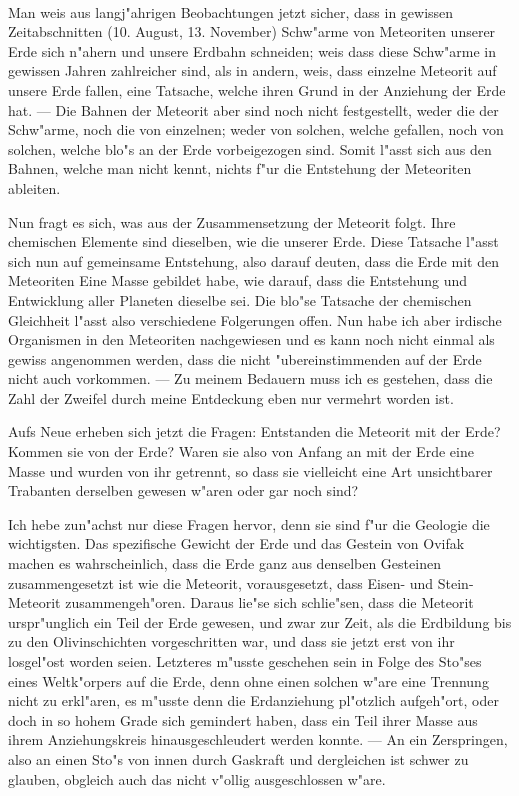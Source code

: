 \documentclass[a4paper, 11pt, oneside]{article}
\begin{document}
\paragraph{}
Man weis aus langj"ahrigen Beobachtungen jetzt sicher, dass in gewissen Zeitabschnitten (10. August, 13. November) Schw"arme von Meteoriten unserer Erde sich n"ahern und unsere Erdbahn schneiden; weis dass diese Schw"arme in gewissen Jahren zahlreicher sind, als in andern, weis, dass einzelne Meteorit auf unsere Erde fallen, eine Tatsache, welche ihren Grund in der Anziehung der Erde hat. --- Die Bahnen der Meteorit aber sind noch nicht festgestellt, weder die der Schw"arme, noch die von einzelnen; weder von solchen, welche gefallen, noch von solchen, welche blo"s an der Erde vorbeigezogen sind. Somit l"asst sich aus den Bahnen, welche man nicht kennt, nichts f"ur die Entstehung der Meteoriten ableiten.

Nun fragt es sich, was aus der Zusammensetzung der Meteorit folgt. Ihre chemischen Elemente sind dieselben, wie die unserer Erde. Diese Tatsache l"asst sich nun auf gemeinsame Entstehung, also darauf deuten, dass die Erde mit den Meteoriten Eine Masse gebildet habe, wie darauf, dass die Entstehung und Entwicklung aller Planeten dieselbe sei. Die blo"se Tatsache der chemischen Gleichheit l"asst also verschiedene Folgerungen offen. Nun habe ich aber irdische Organismen in den Meteoriten nachgewiesen und es kann noch nicht einmal als gewiss angenommen werden, dass die nicht "ubereinstimmenden auf der Erde nicht auch vorkommen. --- Zu meinem Bedauern muss ich es gestehen, dass die Zahl der Zweifel durch meine Entdeckung eben nur vermehrt worden ist.

Aufs Neue erheben sich jetzt die Fragen: Entstanden die Meteorit mit der Erde? Kommen sie von der Erde? Waren sie also von Anfang an mit der Erde eine Masse und wurden von ihr getrennt, so dass sie vielleicht eine Art unsichtbarer Trabanten derselben gewesen w"aren oder gar noch sind?

Ich hebe zun"achst nur diese Fragen hervor, denn sie sind f"ur die Geologie die wichtigsten. Das spezifische Gewicht der Erde und das Gestein von Ovifak machen es wahrscheinlich, dass die Erde ganz aus denselben Gesteinen zusammengesetzt ist wie die Meteorit, vorausgesetzt, dass Eisen- und Stein-Meteorit zusammengeh"oren. Daraus lie"se sich schlie"sen, dass die Meteorit urspr"unglich ein Teil der Erde gewesen, und zwar zur Zeit, als die Erdbildung bis zu den Olivinschichten vorgeschritten war, und dass sie jetzt erst von ihr losgel"ost worden seien. Letzteres m"usste geschehen sein in Folge des Sto"ses eines Weltk"orpers auf die Erde, denn ohne einen solchen w"are eine Trennung nicht zu erkl"aren, es m"usste denn die Erdanziehung pl"otzlich aufgeh"ort, oder doch in so hohem Grade sich gemindert haben, dass ein Teil ihrer Masse aus ihrem Anziehungskreis hinausgeschleudert werden konnte. --- An ein Zerspringen, also an einen Sto"s von innen durch Gaskraft und dergleichen ist schwer zu glauben, obgleich auch das nicht v"ollig ausgeschlossen w"are.
\end{document}
